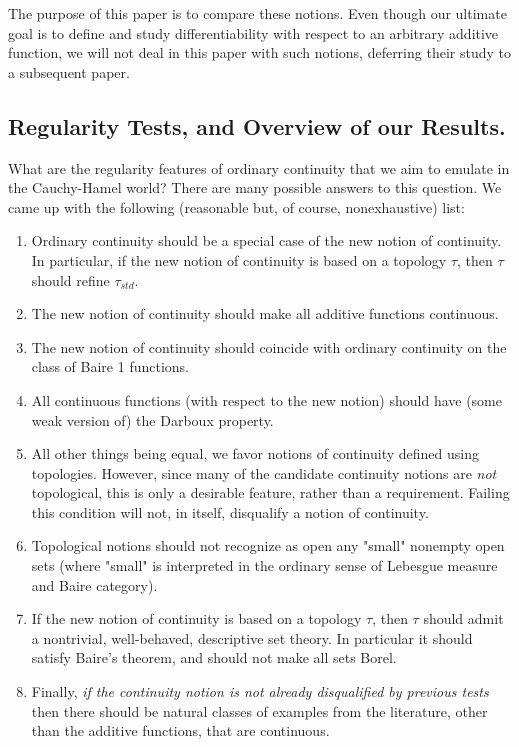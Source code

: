 \documentclass[11pt]{amsart} %
\theoremstyle{definition}
\begin{document}
The purpose of this paper is to compare these notions. 
Even though our ultimate goal is to define and study differentiability with respect to an arbitrary additive function, we will not deal in this paper  with such notions, deferring their study to a
subsequent paper.

\subsection{Regularity Tests, and Overview of our Results.}
 What are the regularity 
features of ordinary continuity that we aim to emulate in the Cauchy-Hamel world? There
are many possible answers to this question. We came up with the following (reasonable but, of course, nonexhaustive) list: 

\begin{enumerate} 
\item Ordinary continuity should be a special case of the new notion of continuity. In particular, if the new notion of continuity is based on a topology $\tau$, then $\tau$ should refine $\tau_{std}$. 

\item The new notion of continuity should make all additive functions continuous.

\item The new notion of continuity should coincide with ordinary continuity on the class of Baire 1 functions.

\item All continuous functions (with respect to the new notion) should
have (some weak version of) the Darboux property.

\item All other things being equal, we favor notions of continuity defined
using topologies. However, since many of the candidate continuity notions are \emph{not} topological, this is only a desirable feature, rather than a requirement. Failing this condition will not, in itself,  disqualify a notion of continuity. 

\item Topological notions should not recognize as open any "small" nonempty open sets (where "small" is interpreted in the ordinary sense of Lebesgue measure and Baire category).

\item If the new notion of continuity is based on a topology $\tau$, then $\tau$ should admit a nontrivial, well-behaved, descriptive set theory. In particular it should satisfy Baire’s theorem, and should not make all sets Borel.
\item Finally, \emph{if the continuity notion is not already disqualified by previous tests} then there should be natural classes of examples from the literature, other than the additive functions, that are continuous. 
\end{enumerate} 
\end{document}
